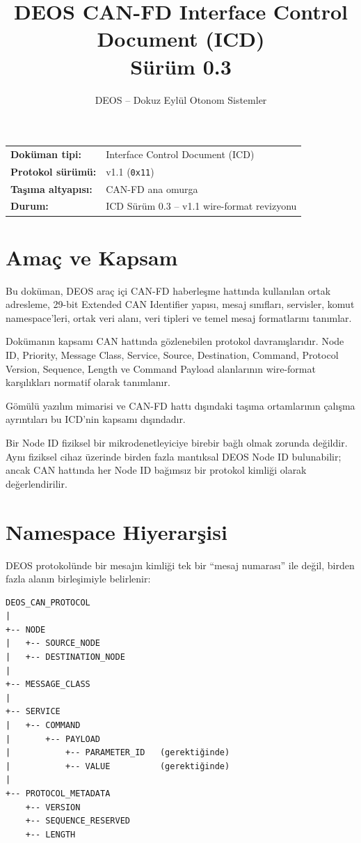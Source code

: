 \documentclass[a4paper,10pt]{article}
\title{\textbf{DEOS CAN-FD Interface Control Document (ICD)}\\
\large Sürüm 0.3}
\author{DEOS -- Dokuz Eylül Otonom Sistemler}
\date{}
\newcommand{\hex}[1]{\texttt{0x#1}}
\begin{document}
\maketitle

\begin{center}
\begin{tabular}{ll}
\textbf{Doküman tipi:} & Interface Control Document (ICD) \\
\textbf{Protokol sürümü:} & v1.1 (\hex{11}) \\
\textbf{Taşıma altyapısı:} & CAN-FD ana omurga \\
\textbf{Durum:} & ICD Sürüm 0.3 -- v1.1 wire-format revizyonu \\
\end{tabular}
\end{center}


\section{Amaç ve Kapsam}

Bu doküman, DEOS araç içi CAN-FD haberleşme hattında kullanılan ortak adresleme,
29-bit Extended CAN Identifier yapısı, mesaj sınıfları, servisler, komut namespace'leri,
ortak veri alanı, veri tipleri ve temel mesaj formatlarını tanımlar.

Dokümanın kapsamı CAN hattında gözlenebilen protokol davranışlarıdır. Node ID, Priority,
Message Class, Service, Source, Destination, Command, Protocol Version, Sequence, Length ve
Command Payload alanlarının wire-format karşılıkları normatif olarak tanımlanır.

Gömülü yazılım mimarisi ve CAN-FD hattı dışındaki taşıma ortamlarının çalışma ayrıntıları
bu ICD'nin kapsamı dışındadır.

Bir Node ID fiziksel bir mikrodenetleyiciye birebir bağlı olmak zorunda değildir. Aynı
fiziksel cihaz üzerinde birden fazla mantıksal DEOS Node ID bulunabilir; ancak CAN hattında
her Node ID bağımsız bir protokol kimliği olarak değerlendirilir.

\section{Namespace Hiyerarşisi}

DEOS protokolünde bir mesajın kimliği tek bir ``mesaj numarası'' ile değil, birden fazla
alanın birleşimiyle belirlenir:

\begin{verbatim}
DEOS_CAN_PROTOCOL
|
+-- NODE
|   +-- SOURCE_NODE
|   +-- DESTINATION_NODE
|
+-- MESSAGE_CLASS
|
+-- SERVICE
|   +-- COMMAND
|       +-- PAYLOAD
|           +-- PARAMETER_ID   (gerektiğinde)
|           +-- VALUE          (gerektiğinde)
|
+-- PROTOCOL_METADATA
    +-- VERSION
    +-- SEQUENCE_RESERVED
    +-- LENGTH
\end{verbatim}
\end{document}
